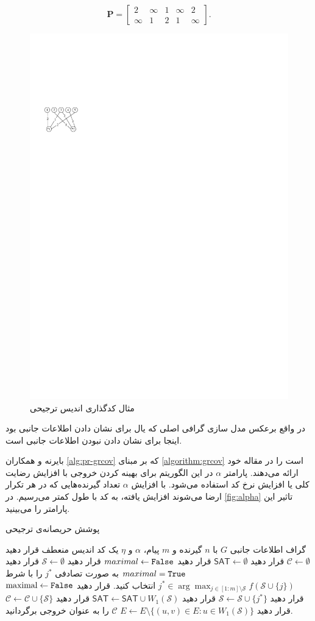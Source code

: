 \begin{example}
\begin{equation*}
	\boldsymbol{P} = 
	\begin{bmatrix}
		2 & \infty & 1 &\infty & 2\\
		\infty & 1 & 2 & 1 & \infty \label{eq:ppicod-instance}
	\end{bmatrix}.
\end{equation*}
\begin{figure}[H]
	\centering
	\includegraphics[width=0.2\linewidth]{figs/chapter4/ppgraph.pdf}
	\caption[
	مثال کدگذاری اندیس ترجیحی
	]{
		مثال کدگذاری اندیس ترجیحی
		\cite{byrne2023preferential}
		}
	\label{fig:ppgraph}
\end{figure}
در واقع برعکس مدل سازی گرافی اصلی که یال برای نشان دادن اطلاعات جانبی بود اینجا برای نشان دادن نبودن اطلاعات جانبی است.
\end{example}
بایرنه و همکاران
\autoref{alg:pr-grcov}
 که بر مبنای 
 \autoref{algorithm:grcov}
  است را در مقاله خود ارائه می‌دهند. پارامتر 
 $\alpha$
 در این الگوریتم برای بهینه کردن خروجی با افزایش رضایت کلی یا افزایش نرخ کد استفاده می‌‌شود. با افزایش 
 $\alpha$
 تعداد گیرنده‌هایی که در هر تکرار ارضا می‌شوند افزایش یافته، به کد با طول کمتر می‌رسیم. در 
 \autoref{fig:alpha}
 تاثیر این پارامتر را می‌بینید.
\begin{algorithm}
	\caption[
		پوشش حریصانه‌ی ترجیحی
	]{
		پوشش حریصانه‌ی ترجیحی
	}
	\label{alg:pr-grcov}
	\begin{algorithmic}[1]
		\Require
			گراف اطلاعات جانبی
		$G$
		با
		$n$
		گیرنده و
		$m$
		پیام،
		$\alpha$
		و
		$\eta$
		\Ensure
		یک کد  اندیس منعطف
		\State قرار دهید
		$\mathcal{C} \gets \emptyset$
		\State قرار دهید
		$\mathsf{SAT} \gets \emptyset$ 
		\State قرار دهید
		$maximal \gets \texttt{False}$
		\State قرار دهید
		$\mathcal{S} \gets \emptyset$
		\State قرار دهید
		$maximal = \texttt{True}$
		\State
		به صورت تصادفی
		$j^{\ast}$
		را با شرط
		$j^* \in \arg \max_{j \in [1:m] \setminus \mathcal{S}} f(\mathcal{S} \cup \{j\})$
		انتخاب کنید.
		\State قرار دهید
		$\textrm{maximal} \gets \texttt{False}$
		\State قرار دهید
		$\mathcal{S} \gets \mathcal{S} \cup \{j^*\}$
		\EndIf
		\EndWhile
		\State قرار دهید
		 $\mathsf{SAT} \gets \mathsf{SAT} \cup W_1(\mathcal{S})$
		\State قرار دهید
		$\mathcal{C} \gets \mathcal{C} \cup \{\mathcal{S}\}$
		\State قرار دهید
		$E \gets E \setminus \{ (u,v) \in E: u \in W_1(\mathcal{S})\}$
		\EndWhile
		\State $\mathcal{C}$
		را به عنوان خروجی برگردانید.
	\end{algorithmic}
\end{algorithm}

